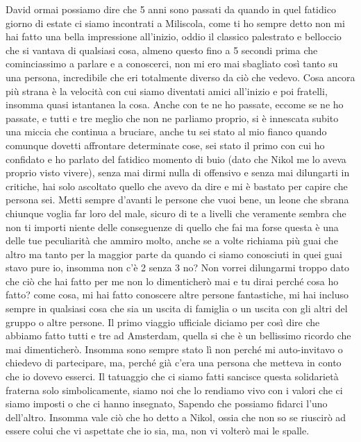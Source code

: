 David ormai possiamo dire che 5 anni sono passati da quando in quel fatidico giorno di estate ci siamo incontrati a Miliscola, come ti ho sempre detto non mi hai fatto una bella impressione all'inizio, oddio il classico palestrato e belloccio che si vantava di qualsiasi cosa, almeno questo fino a 5 secondi prima che cominciassimo a parlare e a conoscerci, non mi ero mai sbagliato così tanto su una persona, incredibile che eri totalmente diverso da ciò che vedevo. Cosa ancora più strana è la velocità con cui siamo diventati amici all'inizio e poi fratelli, insomma quasi istantanea la cosa. Anche con te ne ho passate, eccome se ne ho passate, e tutti e tre meglio che non ne parliamo proprio, si è innescata subito una miccia che continua a bruciare, anche tu sei stato al mio fianco quando comunque dovetti affrontare determinate cose, sei stato il primo con cui ho confidato e ho parlato del fatidico momento di buio (dato che Nikol me lo aveva proprio visto vivere), senza mai dirmi nulla di offensivo e senza mai dilungarti in critiche, hai solo ascoltato quello che avevo da dire e mi è bastato per capire che persona sei. Metti sempre d'avanti le persone che vuoi bene, un leone che sbrana chiunque voglia far loro del male, sicuro di te a livelli che veramente sembra che non ti importi niente delle conseguenze di quello che fai ma forse questa è una delle tue peculiarità che ammiro molto, anche se a volte richiama più guai che altro ma tanto per la maggior parte da quando ci siamo conosciuti in quei guai stavo pure io, insomma non c'è 2 senza 3 no? Non vorrei dilungarmi troppo dato che ciò che hai fatto per me non lo dimenticherò mai e tu dirai perché cosa ho fatto? come cosa, mi hai fatto conoscere altre persone fantastiche, mi hai incluso sempre in qualsiasi cosa che sia un uscita di famiglia o un uscita con gli altri del gruppo o altre persone. Il primo viaggio ufficiale diciamo per così dire che abbiamo fatto tutti e tre ad Amsterdam, quella si che è un bellissimo ricordo che mai dimenticherò. Insomma sono sempre stato lì non perché mi auto-invitavo o chiedevo di partecipare, ma, perché già c'era una persona che metteva in conto che io dovevo esserci. Il tatuaggio che ci siamo fatti sancisce questa solidarietà fraterna solo simbolicamente, siamo noi che lo rendiamo vivo con i valori che ci siamo imposti o che ci hanno insegnato, Sapendo che possiamo fidarci l’uno dell’altro. Insomma vale ciò che ho detto a Nikol, ossia che non so se riuscirò ad essere colui che vi aspettate che io sia, ma, non vi volterò mai le spalle.\\


